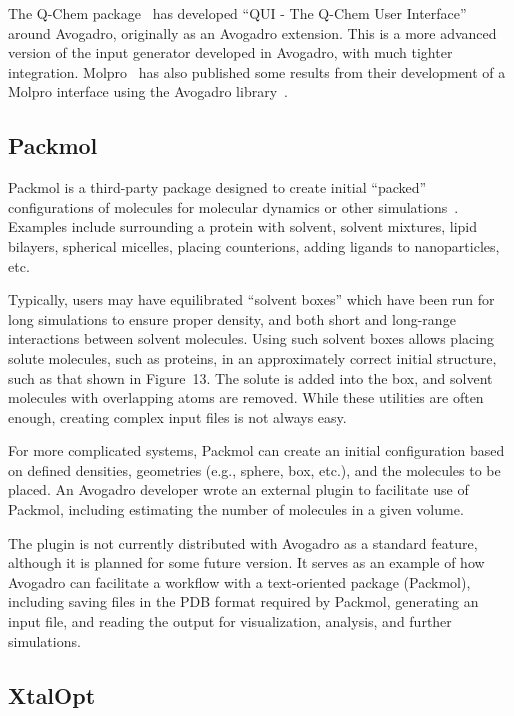 \documentclass[10pt]{bmc_article}
\newenvironment{bmcformat}{\begin{raggedright}
  \baselineskip20pt\sloppy\setboolean{publ}{false}}{\end{raggedright}
  \baselineskip20pt\sloppy}
\begin{document}
\begin{bmcformat}
The Q-Chem package~\cite{Q-Chem3} has developed ``QUI - The Q-Chem User
Interface''~\cite{QUI} around Avogadro, originally as an Avogadro extension.
This is a more advanced version of the input generator developed in Avogadro,
with much tighter integration. Molpro~\cite{MOLPRO} has also published some
results from their development of a Molpro interface using the Avogadro
library~\cite{MOLPROGUI}.

\subsection*{Packmol}

Packmol is a third-party package designed to create initial
``packed'' configurations of molecules for molecular dynamics or other
simulations~\cite{packmol,packmol-packing}. Examples include
surrounding a protein with solvent, solvent mixtures, lipid bilayers,
spherical micelles, placing counterions, adding ligands to
nanoparticles, etc.

Typically, users may have equilibrated ``solvent boxes'' which have
been run for long simulations to ensure proper density, and both short
and long-range interactions between solvent molecules. Using such
solvent boxes allows placing solute molecules, such as proteins, in an
approximately correct initial structure, such as that shown in Figure~13.
The solute is added into the
box, and solvent molecules with overlapping atoms are removed. While
these utilities are often enough, creating complex input files is not
always easy.

For more complicated systems, Packmol can create an initial
configuration based on defined densities, geometries (e.g., sphere,
box, etc.), and the molecules to be placed. An Avogadro developer wrote
an external plugin to facilitate use of Packmol, including estimating
the number of molecules in a given volume.

The plugin is not currently distributed with Avogadro as a standard
feature, although it is planned for some future version. It serves as
an example of how Avogadro can facilitate a workflow with a
text-oriented package (Packmol), including saving files in the PDB
format required by Packmol, generating an input file, and reading the
output for visualization, analysis, and further simulations.

\subsection*{XtalOpt}


\end{bmcformat}
\end{document}
